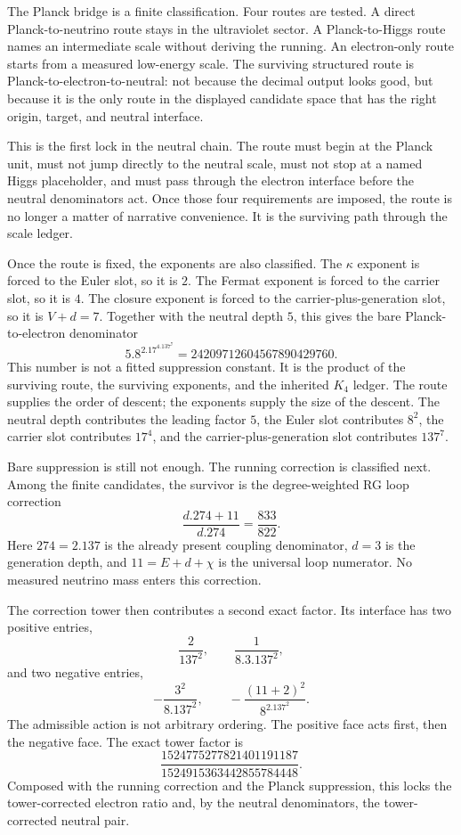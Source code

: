 \documentclass[11pt,a4paper]{book}
\def\cdot{.}%
\begin{document}
The Planck bridge is a finite classification.  Four routes are tested.  A
direct Planck-to-neutrino route stays in the ultraviolet sector.  A
Planck-to-Higgs route names an intermediate scale without deriving the
running.  An electron-only route starts from a measured low-energy scale.  The
surviving structured route is Planck-to-electron-to-neutral: not because the
decimal output looks good, but because it is the only route in the displayed
candidate space that has the right origin, target, and neutral interface.

This is the first lock in the neutral chain.  The route must begin at the
Planck unit, must not jump directly to the neutral scale, must not stop at a
named Higgs placeholder, and must pass through the electron interface before
the neutral denominators act.  Once those four requirements are imposed, the
route is no longer a matter of narrative convenience.  It is the surviving
path through the scale ledger.

Once the route is fixed, the exponents are also classified.  The $\kappa$
exponent is forced to the Euler slot, so it is $2$.  The Fermat exponent is
forced to the carrier slot, so it is $4$.  The closure exponent is forced to
the carrier-plus-generation slot, so it is $V+d=7$.  Together with the
neutral depth $5$, this gives the bare Planck-to-electron denominator
\[
  5\cdot8^2\cdot17^4\cdot137^7
  = 24209712604567890429760.
\]
This number is not a fitted suppression constant.  It is the product of the
surviving route, the surviving exponents, and the inherited $K_4$ ledger.
The route supplies the order of descent; the exponents supply the size of the
descent.  The neutral depth contributes the leading factor $5$, the Euler
slot contributes $8^2$, the carrier slot contributes $17^4$, and the
carrier-plus-generation slot contributes $137^7$.

Bare suppression is still not enough.  The running correction is classified
next.  Among the finite candidates, the survivor is the degree-weighted RG
loop correction
\[
  \frac{d\cdot274+11}{d\cdot274} = \frac{833}{822}.
\]
Here $274=2\cdot137$ is the already present coupling denominator, $d=3$ is
the generation depth, and $11=E+d+\chi$ is the universal loop numerator.  No
measured neutrino mass enters this correction.

The correction tower then contributes a second exact factor.  Its interface
has two positive entries,
\[
  \frac{2}{137^2},\qquad
  \frac{1}{8\cdot3\cdot137^2},
\]
and two negative entries,
\[
  -\frac{3^2}{8\cdot137^2},\qquad
  -\frac{(11+2)^2}{8^2\cdot137^2}.
\]
The admissible action is not arbitrary ordering.  The positive face acts
first, then the negative face.  The exact tower factor is
\[
  \frac{1524775277821401191187}{1524915363442855784448}.
\]
Composed with the running correction and the Planck suppression, this locks
the tower-corrected electron ratio and, by the neutral denominators, the
tower-corrected neutral pair.
\end{document}
